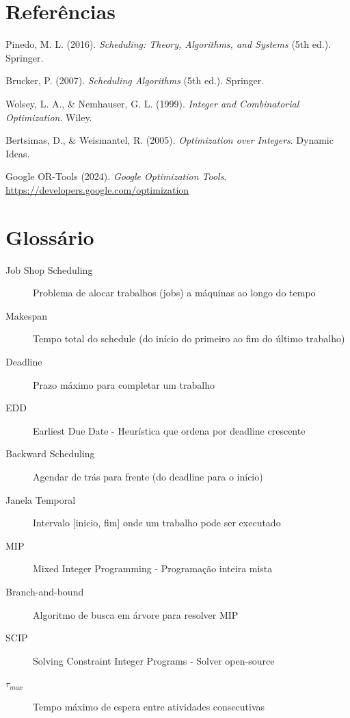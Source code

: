 \documentclass[11pt,a4paper]{article}
\begin{document}
\section*{Referências}

\begin{small}
\begin{enumerate}[label={[\arabic*]}]
\setlength{\itemsep}{0.5em}
\setlength{\parskip}{0em}

\item Pinedo, M. L. (2016). \emph{Scheduling: Theory, Algorithms, and Systems} (5th ed.). Springer.

\item Brucker, P. (2007). \emph{Scheduling Algorithms} (5th ed.). Springer.

\item Wolsey, L. A., \& Nemhauser, G. L. (1999). \emph{Integer and Combinatorial Optimization}. Wiley.

\item Bertsimas, D., \& Weismantel, R. (2005). \emph{Optimization over Integers}. Dynamic Ideas.

\item Google OR-Tools (2024). \emph{Google Optimization Tools}. \url{https://developers.google.com/optimization}

\end{enumerate}
\end{small}

\appendix

\section{Glossário}

\begin{description}
\item[Job Shop Scheduling] Problema de alocar trabalhos (jobs) a máquinas ao longo do tempo
\item[Makespan] Tempo total do schedule (do início do primeiro ao fim do último trabalho)
\item[Deadline] Prazo máximo para completar um trabalho
\item[EDD] Earliest Due Date - Heurística que ordena por deadline crescente
\item[Backward Scheduling] Agendar de trás para frente (do deadline para o início)
\item[Janela Temporal] Intervalo [inicio, fim] onde um trabalho pode ser executado
\item[MIP] Mixed Integer Programming - Programação inteira mista
\item[Branch-and-bound] Algoritmo de busca em árvore para resolver MIP
\item[SCIP] Solving Constraint Integer Programs - Solver open-source
\item[$\tau_{max}$] Tempo máximo de espera entre atividades consecutivas
\end{description}
\end{document}
